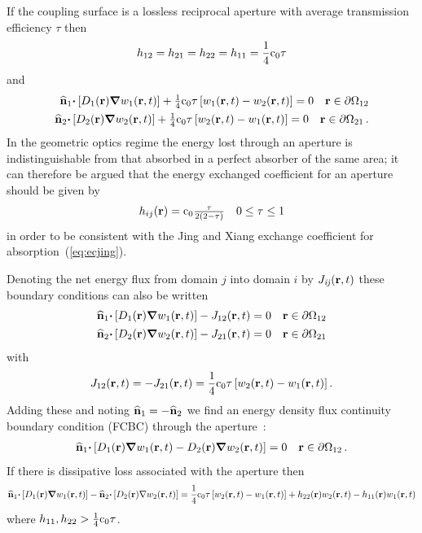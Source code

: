 \documentclass[a4paper]{article}
\numberwithin{equation}{section}
\begin{document}
If the coupling surface is a lossless reciprocal aperture with average
transmission efficiency $\tau$ then
\begin{align}
h_{12} = h_{21} = h_{22} = h_{11} = \frac{1}{4}\rc_0\tau
\end{align}
and
\begin{align}
\begin{matrix}
\uvn_1{\vcdot}\left[D_1\pr{\vnabla}w_1\prt\right]+\frac{1}{4}\rc_0\tau\left[w_1\prt-w_2\prt\right]=0 &\vr\in\partial\Omega_{12}
\end{matrix}\\
\begin{matrix}
\uvn_2{\vcdot}\left[D_2\pr{\vnabla}w_2\prt\right]+\frac{1}{4}\rc_0\tau\left[w_2\prt-w_1\prt\right]=0 &\vr\in\partial\Omega_{21}
\end{matrix}\,.
\end{align}
In the geometric optics regime the energy lost through an aperture is indistinguishable from that
absorbed in a perfect absorber of the same area; it can therefore be argued that the energy
exchanged coefficient for an aperture should be given by
\begin{align}
\begin{matrix}
h_{ij}\pr = \rc_0\frac{\tau}{2\left(2-\tau\right)} &0\leq\tau\leq 1
\end{matrix}
\end{align}
in order to be consistent with the Jing and Xiang exchange coefficient for
absorption~(\ref{eq:ecjing}).

Denoting the net energy flux from domain $j$ into domain $i$ by 
$J_{\mathit{ij}}\prt$ these boundary conditions can also be written
\begin{align}
\begin{matrix}
\uvn_1{\vcdot}\left[D_1\pr{\vnabla}w_1\prt\right]-J_{12}\prt=0 &\vr\in\partial\Omega_{12}
\end{matrix}\\
\begin{matrix}
\uvn_2{\vcdot}\left[D_2\pr{\vnabla}w_2\prt\right]-J_{21}\prt=0 &\vr\in\partial\Omega_{21}
\end{matrix}
\end{align}
with
\begin{align}
J_{12}\prt = -J_{21}\prt = \frac{1}{4}\rc_0\tau\left[w_2\prt-w_1\prt\right].
\end{align}
Adding these and noting $\uvn_1=-\uvn_2$ we find an energy density flux continuity
boundary condition (FCBC) through the aperture~\citep{Billon2008}:
\begin{align}
\label{eq:fcbc}
\begin{matrix}
\uvn_1{\vcdot}\left[D_1\pr{\vnabla}w_1\prt-D_2\pr{\vnabla}w_2\prt\right]=0 &\vr\in\partial\Omega_{12}
\end{matrix}\,.
\end{align}
If there is dissipative loss associated with the aperture then
\begin{align}
\uvn_1{\vcdot}\left[D_1\pr{\vnabla}w_1\prt\right]-\uvn_2{\vcdot}\left[D_2\pr{\nabla}w_2\prt\right]=\frac{1}{4}\rc_0\tau
\left[w_2\prt-w_1\prt\right]+h_{22}\pr w_2\prt-h_{11}\pr w_1\prt
\end{align}
where $h_{11},h_{22}>\frac{1}{4}\rc_0\tau$.
\end{document}
